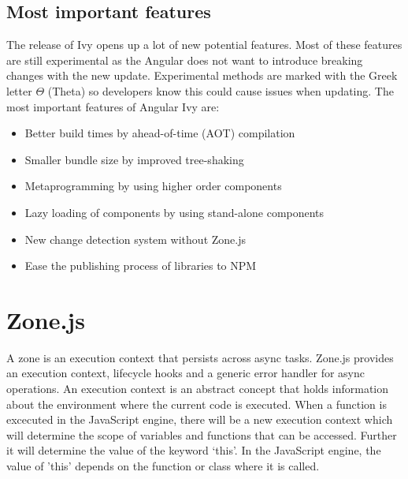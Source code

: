 \subsection{Most important features}
The release of Ivy opens up a lot of new potential features. Most of these features are still experimental as the Angular does not want to introduce breaking changes with the new update. Experimental methods are marked with the Greek letter \(\Theta\) (Theta) so developers know this could cause issues when updating. The most important features of Angular Ivy are:
\begin{itemize}
    \item Better build times by ahead-of-time (AOT) compilation
    \item Smaller bundle size by improved tree-shaking
    \item Metaprogramming by using higher order components \autocite{Savkin2018}
    \item Lazy loading of components by using stand-alone components
    \item New change detection system without Zone.js
    \item Ease the publishing process of libraries to NPM
\end{itemize}

\autocite{Exbrayat2019}


\section{Zone.js}
A zone is an execution context that persists across async tasks. Zone.js provides an execution context, lifecycle hooks and a generic error handler for async operations. An execution context is an abstract concept that holds information about the environment where the current code is executed. When a function is excecuted in the JavaScript engine, there will be a new execution context which will determine the scope of variables and functions that can be accessed. Further it will determine the value of the keyword ‘this’. In the JavaScript engine, the value of 'this' depends on the function or class where it is called.

